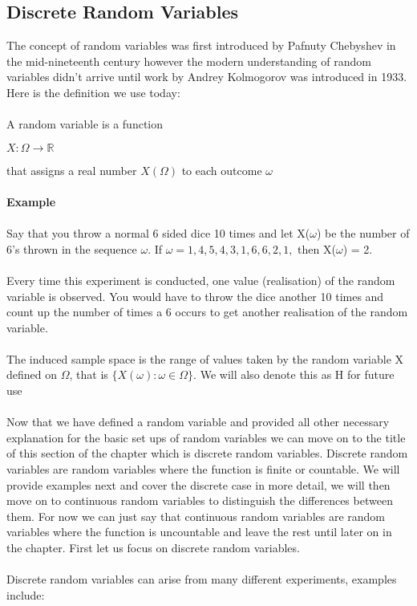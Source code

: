 \documentclass[,oneside]{article}
\begin{document}
\begin{enumerate}
\subsection{Discrete Random Variables}
The concept of random variables was first introduced by Pafnuty Chebyshev in the mid-nineteenth century however the modern understanding of random variables didn't arrive until work by Andrey Kolmogorov was introduced in 1933. Here is the definition we use today:\\ 
\\A random variable is a function
\begin{center}
$X: \Omega \rightarrow \mathbb{R}$
\end{center}
that assigns a real number $X(\Omega)$ to each outcome $\omega$\\
\\ \textbf{Example}\\ \\
Say that you throw a normal 6 sided dice 10 times and let X($\omega$) be the number of 6's thrown in the sequence $\omega$. If $\omega = 1,4,5,4,3,1,6,6,2,1,$ then X($\omega$) = 2.\\
\\Every time this experiment is conducted, one value (realisation) of the random variable is observed. You would have to throw the dice another 10 times and count up the number of times a 6 occurs to get another realisation of the random variable.\\ \\
The induced sample space is the range of values taken by the random variable X defined on $\Omega$, that is $\{X(\omega) : \omega \in \Omega\}$. We will also denote this as H for future use\\ \\
Now that we have defined a random variable and provided all other necessary explanation for the basic set ups of random variables we can move on to the title of this section of the chapter which is discrete random variables. Discrete random variables are random variables where the function is finite or countable. We will provide examples next and cover the discrete case in more detail, we will then move on to continuous random variables to distinguish the differences between them. For now we can just say that continuous random variables are random variables where the function is uncountable and leave the rest until later on in the chapter. First let us focus on discrete random variables.\\
\\Discrete random variables can arise from many different experiments, examples include:\\

\end{enumerate}
\end{document}
